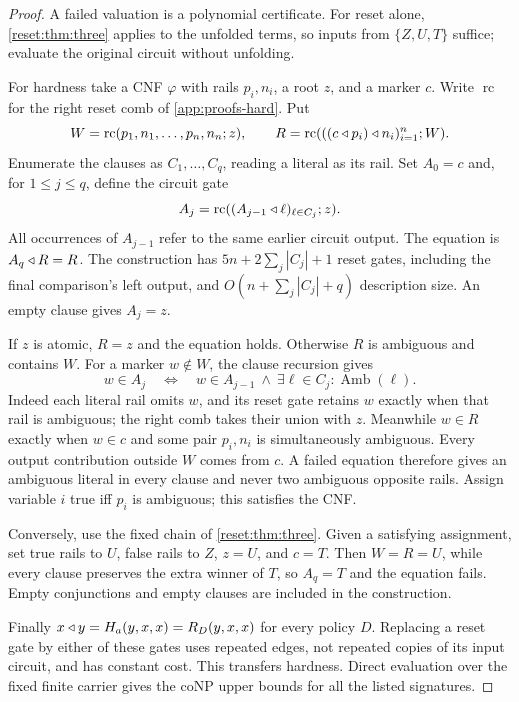 \begin{proof}
A failed valuation is a polynomial certificate. For reset alone,
\cref{reset:thm:three} applies to the unfolded terms, so inputs from
$\{Z,U,T\}$ suffice; evaluate the original circuit without unfolding.

For hardness take a CNF $\varphi$ with rails $p_i,n_i$, a root $z$,
and a marker $c$. Write $\operatorname{rc}$ for the right reset comb
of \cref{app:proofs-hard}. Put
\[
 W=\operatorname{rc}(p_1,n_1,\ldots,p_n,n_n;z),\qquad
 R=\operatorname{rc}(((c\mathbin{\triangleleft} p_i)\mathbin{\triangleleft} n_i)_{i=1}^n;W).
\]
Enumerate the clauses as $C_1,\ldots,C_q$, reading a literal as its
rail. Set $A_0=c$ and, for $1\leq j\leq q$, define the circuit gate
\[
 A_j=\operatorname{rc}((A_{j-1}\mathbin{\triangleleft}\ell)_{\ell\in C_j};z).
\]
All occurrences of $A_{j-1}$ refer to the same earlier circuit output.
The equation is $A_q\mathbin{\triangleleft} R=R$. The construction has
$5n+2\sum_j|C_j|+1$ reset gates, including the final comparison's
left output, and $O(n+\sum_j|C_j|+q)$ description size.
An empty clause gives $A_j=z$.

If $z$ is atomic, $R=z$ and the equation holds. Otherwise $R$ is
ambiguous and contains $W$. For a marker $w\notin W$, the clause
recursion gives
\[
 w\in A_j\quad\Longleftrightarrow\quad
 w\in A_{j-1}\ \land\
 \exists\ell\in C_j:\operatorname{Amb}(\ell).
\]
Indeed each literal rail omits $w$, and its reset gate retains $w$
exactly when that rail is ambiguous; the right comb takes their union
with $z$. Meanwhile $w\in R$ exactly when $w\in c$ and some pair
$p_i,n_i$ is simultaneously ambiguous. Every output contribution
outside $W$ comes from $c$. A failed equation therefore gives an
ambiguous literal in every clause and never two ambiguous opposite
rails. Assign variable $i$ true iff $p_i$ is ambiguous; this satisfies
the CNF.

Conversely, use the fixed chain of \cref{reset:thm:three}. Given a
satisfying assignment, set true rails to $U$, false rails to $Z$,
$z=U$, and $c=T$. Then $W=R=U$, while every clause preserves the
extra winner of $T$, so $A_q=T$ and the equation fails. Empty
conjunctions and empty clauses are included in the construction.

Finally $x\mathbin{\triangleleft} y=H_a(y,x,x)=R_D(y,x,x)$ for every policy $D$.
Replacing a reset gate by either of these gates uses repeated edges,
not repeated copies of its input circuit, and has constant cost.
This transfers hardness. Direct evaluation over the fixed finite
carrier gives the coNP upper bounds for all the listed signatures.
\end{proof}

